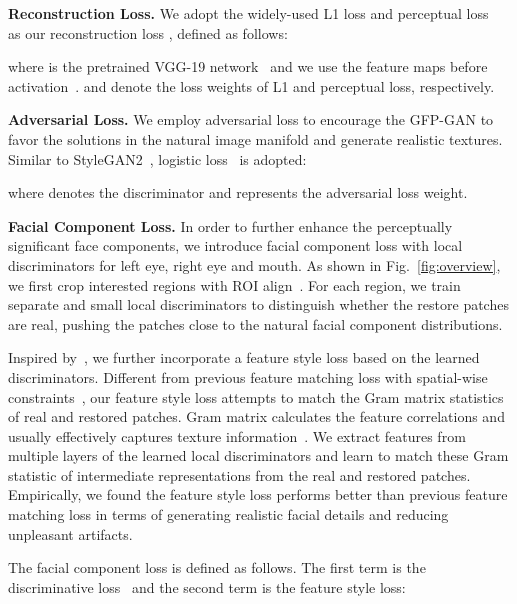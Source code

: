 \documentclass[final]{cvpr}
\begin{document}
\noindent\textbf{Reconstruction Loss.}
We adopt the widely-used L1 loss and perceptual loss~\cite{johnson2016perceptual, ledig2017srgan} as our reconstruction loss , defined as follows:
\vspace{-0.3em}

\vspace{-0.3em}
where  is the pretrained VGG-19 network~\cite{simonyan2015vgg} and we use the  feature maps before activation~\cite{wang2018esrgan}.  and  denote the loss weights of L1 and perceptual loss, respectively.

\noindent\textbf{Adversarial Loss.}
We employ adversarial loss  to encourage the GFP-GAN to favor the solutions in the natural image manifold and generate realistic textures. Similar to StyleGAN2~\cite{karras2020stylegan2}, logistic loss~\cite{goodfellow2014gan} is adopted:
\vspace{-0.8em}

where  denotes the discriminator and  represents the adversarial loss weight.


\noindent\textbf{Facial Component Loss.}
In order to further enhance the perceptually significant face components, we introduce facial component loss with local discriminators for left eye, right eye and mouth. 
As shown in Fig.~\ref{fig:overview}, we first crop interested regions with ROI align~\cite{he2017maskrcnn}. For each region, we train separate and small local discriminators to distinguish whether the restore patches are real, pushing the patches close to the natural facial component distributions.

Inspired by~\cite{wang2017pix2pixHD}, we further incorporate a feature style loss based on the learned discriminators. Different from previous feature matching loss with spatial-wise constraints~\cite{wang2017pix2pixHD}, our feature style loss attempts to match the Gram matrix statistics~\cite{gatys2016style} of real and restored patches. Gram matrix calculates the feature correlations and usually effectively captures texture information~\cite{gondal2018unreasonable}. 
We extract features from multiple layers of the learned local discriminators and learn to match these Gram statistic of intermediate representations from the real and restored patches.
Empirically, we found the feature style loss performs better than previous feature matching loss in terms of generating realistic facial details and reducing unpleasant artifacts.

The facial component loss is defined as follows. The first term is the discriminative loss~\cite{goodfellow2014gan} and the second term is the feature style loss:
\end{document}
